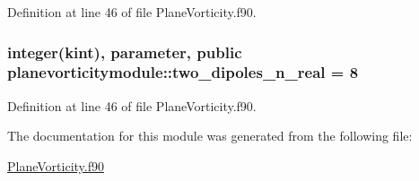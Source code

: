 Definition at line 46 of file Plane\+Vorticity.\+f90.

\hypertarget{classplanevorticitymodule_afa6ffc2e42f02af0d222cf41f8c89c6f}{
\subsubsection[{two\+\_\+dipoles\+\_\+n\+\_\+real}]{\setlength{\rightskip}{0pt plus 5cm}integer(kint), parameter, public planevorticitymodule\+::two\+\_\+dipoles\+\_\+n\+\_\+real = 8}}\label{classplanevorticitymodule_afa6ffc2e42f02af0d222cf41f8c89c6f}


Definition at line 46 of file Plane\+Vorticity.\+f90.



The documentation for this module was generated from the following file\+:\begin{DoxyCompactItemize}
\item 
\hyperlink{PlaneVorticity_8f90}{Plane\+Vorticity.\+f90}\end{DoxyCompactItemize}
